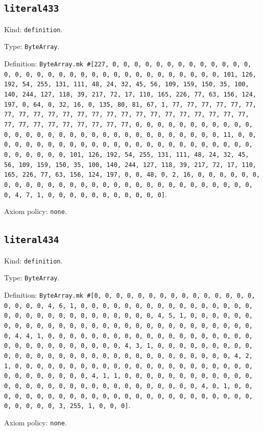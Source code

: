 \documentclass[11pt]{article}
\begin{document}
\subsection*{\texttt{literal433}}
\noindent Kind: \texttt{definition}.\par
\noindent Type: \texttt{ByteArray}.\par
\noindent Definition: \texttt{ByteArray.mk \#[227, 0, 0, 0, 0, 0, 0, 0, 0, 0, 0, 0, 0, 0, 0, 0, 0, 0, 0, 0, 0, 0, 0, 0, 0, 0, 0, 0, 0, 0, 0, 0, 0, 0, 101, 126, 192, 54, 255, 131, 111, 48, 24, 32, 45, 56, 109, 159, 150, 35, 100, 140, 244, 127, 118, 39, 217, 72, 17, 110, 165, 226, 77, 63, 156, 124, 197, 0, 64, 0, 32, 16, 0, 135, 80, 81, 67, 1, 77, 77, 77, 77, 77, 77, 77, 77, 77, 77, 77, 77, 77, 77, 77, 77, 77, 77, 77, 77, 77, 77, 77, 77, 77, 77, 77, 77, 77, 77, 77, 77, 0, 0, 0, 0, 0, 0, 0, 0, 0, 0, 0, 0, 0, 0, 0, 0, 0, 0, 0, 0, 0, 0, 0, 0, 0, 0, 0, 0, 0, 0, 0, 11, 0, 0, 0, 0, 0, 0, 0, 0, 0, 0, 0, 0, 0, 0, 0, 0, 0, 0, 0, 0, 0, 0, 0, 0, 0, 0, 0, 0, 0, 0, 0, 101, 126, 192, 54, 255, 131, 111, 48, 24, 32, 45, 56, 109, 159, 150, 35, 100, 140, 244, 127, 118, 39, 217, 72, 17, 110, 165, 226, 77, 63, 156, 124, 197, 0, 0, 48, 0, 2, 16, 0, 0, 0, 0, 0, 0, 0, 0, 0, 0, 0, 0, 0, 0, 0, 0, 0, 0, 0, 0, 0, 0, 0, 0, 0, 0, 0, 0, 0, 0, 4, 7, 1, 0, 0, 0, 0, 0, 0, 0, 0, 0, 0, 0]}.\par
\noindent Axiom policy: \texttt{none}.\par
\subsection*{\texttt{literal434}}
\noindent Kind: \texttt{definition}.\par
\noindent Type: \texttt{ByteArray}.\par
\noindent Definition: \texttt{ByteArray.mk \#[0, 0, 0, 0, 0, 0, 0, 0, 0, 0, 0, 0, 0, 0, 0, 0, 0, 0, 0, 4, 6, 1, 0, 0, 0, 0, 0, 0, 0, 0, 0, 0, 0, 0, 0, 0, 0, 0, 0, 0, 0, 0, 0, 0, 0, 0, 0, 0, 0, 0, 0, 0, 4, 5, 1, 0, 0, 0, 0, 0, 0, 0, 0, 0, 0, 0, 0, 0, 0, 0, 0, 0, 0, 0, 0, 0, 0, 0, 0, 0, 0, 0, 0, 0, 0, 4, 4, 1, 0, 0, 0, 0, 0, 0, 0, 0, 0, 0, 0, 0, 0, 0, 0, 0, 0, 0, 0, 0, 0, 0, 0, 0, 0, 0, 0, 0, 0, 0, 4, 3, 1, 0, 0, 0, 0, 0, 0, 0, 0, 0, 0, 0, 0, 0, 0, 0, 0, 0, 0, 0, 0, 0, 0, 0, 0, 0, 0, 0, 0, 0, 0, 4, 2, 1, 0, 0, 0, 0, 0, 0, 0, 0, 0, 0, 0, 0, 0, 0, 0, 0, 0, 0, 0, 0, 0, 0, 0, 0, 0, 0, 0, 0, 0, 0, 4, 1, 1, 0, 0, 0, 0, 0, 0, 0, 0, 0, 0, 0, 0, 0, 0, 0, 0, 0, 0, 0, 0, 0, 0, 0, 0, 0, 0, 0, 0, 0, 0, 4, 0, 1, 0, 0, 0, 0, 0, 0, 0, 0, 0, 0, 0, 0, 0, 0, 0, 0, 0, 0, 0, 0, 0, 0, 0, 0, 0, 0, 0, 0, 0, 0, 3, 255, 1, 0, 0, 0]}.\par
\noindent Axiom policy: \texttt{none}.\par
\end{document}
